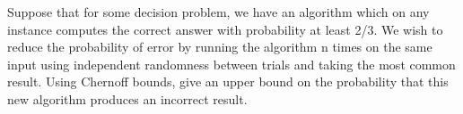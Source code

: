\problem{}
Suppose that for some decision problem, we have an algorithm which on any instance computes the correct answer with probability at least 2/3. We wish to reduce the probability of error by running the algorithm n times on the same input using independent randomness between trials and taking the most common result. Using Chernoff bounds, give an upper bound on the probability that this new algorithm produces an incorrect result.

